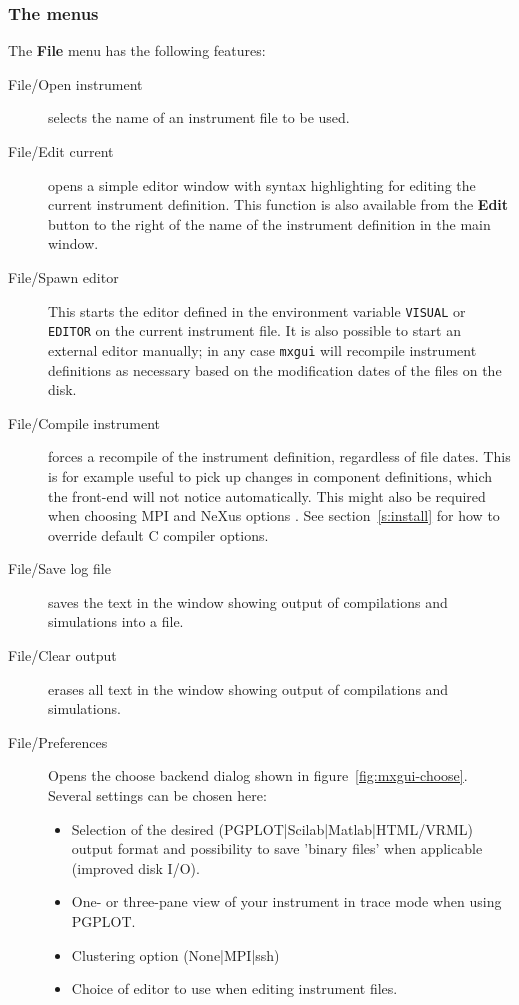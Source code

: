 \subsubsection{The menus}

The {\bf File} menu has the following features:
\begin{description}
\item[File/Open instrument] selects the name of an instrument file to be used.
\item[File/Edit current] opens a simple editor window with \MCX  syntax
  highlighting for editing the
  current instrument definition. This function is also available from
  the {\bf Edit} button to the right of the name of the instrument definition in
  the main window.
\item[File/Spawn editor] This starts the editor defined in the environment
  variable \verb+VISUAL+ or \verb+EDITOR+ on the current instrument
  file. It is also possible to start an external editor manually; in any
  case \verb+mxgui+ will recompile instrument definitions as necessary based on
  the modification dates of the files on the disk.
\item[File/Compile instrument] forces a recompile of the instrument
  definition, regardless of file dates. This is for example useful to
  pick up changes in component definitions, which the front-end will not
  notice automatically. This might also be required when choosing MPI  and NeXus options . See section~\ref{s:install} for how to override
  default C compiler options.
\item[File/Save log file] saves the text in the window showing output of
  compilations and simulations into a file.
\item[File/Clear output] erases all text in the window showing output of
  compilations and simulations.
  \item[File/Preferences] Opens the choose backend dialog shown in
  figure~\ref{fig:mxgui-choose}. Several settings can be chosen here:
\begin{itemize}
  \item Selection of  the desired (PGPLOT|Scilab|Matlab|HTML/VRML) output
    format and possibility to save 'binary files' when
  applicable (improved disk I/O).
  \item One- or three-pane view of your instrument in trace mode when
    using PGPLOT.
  \item Clustering option (None|MPI|ssh)
  \item Choice of editor to use when editing instrument files.

\end{itemize}
\end{description}
